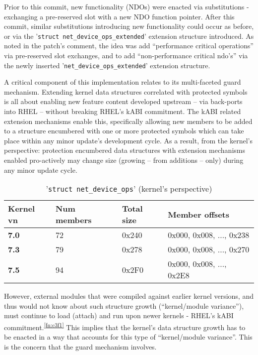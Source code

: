 \documentclass[10pt,oneside,english]{book}
\begin{document}
Prior to this commit, new functionality (NDOs) were enacted via substitutions
- exchanging a pre-reserved slot with a new NDO function pointer.
After this commit, similar substitutions introducing new functionality
could occur as before, or via the '\texttt{struct net\_device\_ops\_extended}'
extension structure introduced. As noted in the patch's comment, the
idea was add ``performance critical operations'' via pre-reserved
slot exchanges, and to add ``non-performance critical ndo's'' via
the newly inserted '\texttt{net\_device\_ops\_extended}' extension
structure.

A critical component of this implementation relates to its multi-faceted
guard mechanism. Extending kernel data structures correlated with
protected symbols is all about enabling new feature content developed
upstream -- via back-ports into RHEL -- without breaking RHEL's
kABI commitment. The kABI related extension mechanisms enable this,
specifically allowing new members to be added to a structure encumbered
with one or more protected symbols which can take place within any
minor update's development cycle. As a result, from the kernel's perspective:
protection encumbered data structures with extension mechanisms enabled
pro-actively may change size (growing -- from additions -- only)
during any minor update cycle.

\begin{table}[h]
\begin{centering}
\begin{tabular}{@{}l|lll@{}}
\textbf{Kernel vn} & \textbf{Num members} & \textbf{Total size} & \textbf{Member offsets}\tabularnewline
\hline 
\textbf{7.0 } & 72  & 0x240  & 0x000, 0x008, ..., 0x238\tabularnewline
\textbf{7.3 } & 79  & 0x278  & 0x000, 0x008, ..., 0x270\tabularnewline
\textbf{7.5 } & 94  & 0x2F0  & 0x000, 0x008, ..., 0x2E8\tabularnewline
\end{tabular}
\par\end{centering}
\caption{'\texttt{struct net\_device\_ops}' (kernel's perspective)}
\end{table}

However, external modules that were compiled against earlier kernel
versions, and thus would not know about such structure growth (``kernel/module
variance''), must continue to load (attach) and run upon newer kernels
- RHEL's kABI commitment.\textsuperscript{\ref{fn:c3f1}} This implies
that the kernel's data structure growth has to be enacted in a way
that accounts for this type of ``kernel/module variance''. This
is the concern that the guard mechanism involves.
\end{document}
